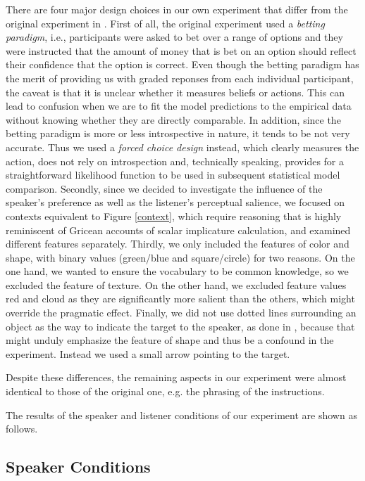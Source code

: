 There are four major design choices in our own experiment that differ
from the original experiment in \cite{Frank}. First of all, the
original experiment used a \emph{betting paradigm}, i.e., participants
were asked to bet over a range of options and they were instructed
that the amount of money that is bet on an option should reflect their
confidence that the option is correct. Even though the betting
paradigm has the merit of providing us with graded reponses from each
individual participant, the caveat is that it is unclear whether it
measures beliefs or actions. This can lead to confusion when we are to
fit the model predictions to the empirical data without knowing
whether they are directly comparable. In addition, since the betting
paradigm is more or less introspective in nature, it tends to be not
very accurate. Thus we used a \emph{forced choice design} instead,
which clearly measures the action, does not rely on introspection and,
technically speaking, provides for a straightforward likelihood
function to be used in subsequent statistical model comparison.
Secondly, since we decided to investigate the influence of the
speaker's preference as well as the listener's perceptual salience, we
focused on contexts equivalent to Figure \ref{context}, which require
reasoning that is highly reminiscent of Gricean accounts of scalar
implicature calculation, and examined different features separately.
Thirdly, we only included the features of color and shape, with binary
values (green/blue and square/circle) for two reasons. On the one hand, 
we wanted to ensure the vocabulary to be common knowledge, so we excluded 
the feature of texture. On the other hand, we excluded feature values red 
and cloud as they are significantly more salient than the others, which 
might override the pragmatic effect. 
Finally, we did not use dotted lines surrounding an object as
the way to indicate the target to the speaker, as done in \cite{Frank},
because that might unduly emphasize the feature of shape and thus be a
confound in the experiment. Instead we used a small arrow pointing to
the target.

Despite these differences, the remaining aspects in our experiment
were almost identical to those of the original one, e.g. the phrasing
of the instructions.

The results of the speaker and listener conditions of our experiment
are shown as follows.

 
\subsection{Speaker Conditions}

